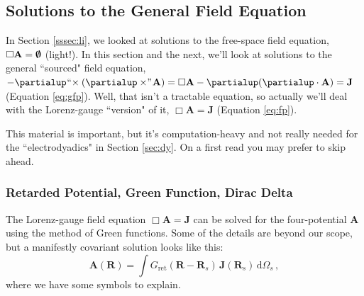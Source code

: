 \documentclass[12pt]{article}
\renewcommand{\vv}[1]{\mathbf{#1}}
\newcommand{\dd}[1]{\mathrm{d}#1}
\begin{document}
\subsection{Solutions to the General Field Equation}\label{ssec:retpot}

In Section \ref{sssec:li}, we looked at solutions to the free-space field equation, ${\Box \vv A = \textrm{\mbox{\boldmath$\emptyset$}}}$ (light!). In this section and the next, we'll look at solutions to the general ``sourced" field equation, $- \partialup \mkern1mu `` \mkern-4mu \times ( \partialup \times \mkern-4mu " \mkern1mu \vv A) = \Box \vv A - \partialup ( \partialup \cdot \vv A) = \vv J$ (Equation \ref{eq:gfp}). Well, that isn't a tractable equation, so actually we'll deal with the Lorenz-gauge ``version" of it, $\Box \vv A = \vv J$ (Equation \ref{eq:fp}).

This material is important, but it's computation-heavy and not really needed for the ``electrodyadics" in Section \ref{sec:dy}. On a first read you may prefer to skip ahead.

\subsubsection{Retarded Potential, Green Function, Dirac Delta}\label{sssec:retpotsub}

The Lorenz-gauge field equation $\Box \vv A = \vv J$ can be solved for the four-potential $\vv A$ using the method of Green functions. Some of the details are beyond our scope, but a manifestly covariant solution looks like this:
\begin{equation}\label{eq:retfp}
\boxed{
\vv A(\vv R) = \int G_{\textrm{ret}} ( \vv R - \vv R_{s} ) \, \vv J (\vv R _{s}) \, \dd \Omega_{s}
} \, ,
\end{equation}
where we have some symbols to explain.
\end{document}
